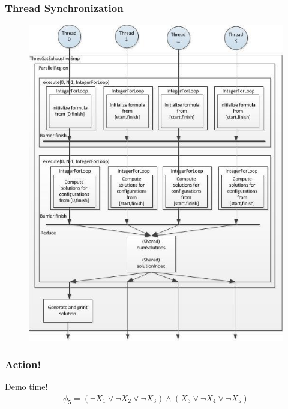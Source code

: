 \documentclass[handout,10pt]{beamer}
\begin{document}
\begin{frame}
	\frametitle{Thread Synchronization}
\vspace{-1em}
\begin{figure}
\centering
\includegraphics[scale = 0.29]{design.jpg}
\end{figure}
\end{frame}

\begin{frame}
	\frametitle{Action!}
	\begin{center}
		Demo time!
		\begin{align*}
			\phi_5 = (\lnot X_1 \lor \lnot X_2 \lor \lnot X_3) \land (X_3 \lor \lnot X_4 \lor \lnot X_5)
		\end{align*}
	\end{center}
\end{frame}
\end{document}
